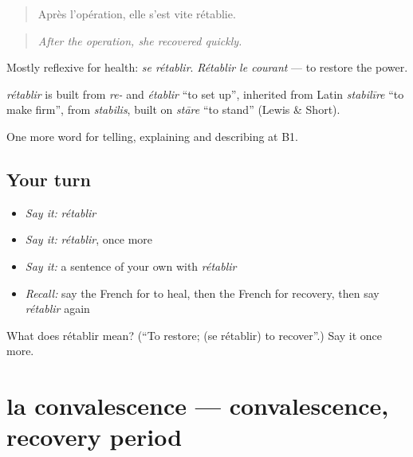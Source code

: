 \begin{quote}
Après l'opération, elle s'est vite rétablie.
\end{quote}

\begin{quote}
\emph{After the operation, she recovered quickly.}
\end{quote}

Mostly reflexive for health: \emph{se rétablir}. \emph{Rétablir le courant} — to restore the power.

\begin{cousinweb}
\emph{rétablir} is built from \emph{re-} and \emph{établir} \textquotedblleft{}to set up\textquotedblright{}, inherited from Latin \emph{stabilīre} \textquotedblleft{}to make firm\textquotedblright{}, from \emph{stabilis}, built on \emph{stāre} \textquotedblleft{}to stand\textquotedblright{} (Lewis \& Short).
\end{cousinweb}

\begin{grammarlens}[title={What you've built}]
One more word for telling, explaining and describing at B1.
\end{grammarlens}

\subsection*{Your turn}
\begin{itemize}
\raggedright
  \item \emph{Say it:} \emph{rétablir}
  \item \emph{Say it:} \emph{rétablir}, once more
  \item \emph{Say it:} a sentence of your own with \emph{rétablir}
  \item \emph{Recall:} say the French for to heal, then the French for recovery, then say \emph{rétablir} again
\end{itemize}

\begin{tcolorbox}[breakable,colback=teal!4,colframe=teal!35!black,title={Before you move on}]
What does rétablir mean? (\textquotedblleft{}To restore; (se rétablir) to recover\textquotedblright{}.) Say it once more.
\end{tcolorbox}
\section[la convalescence]{la convalescence — convalescence, recovery period}

